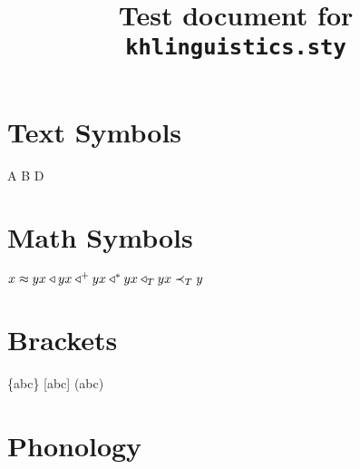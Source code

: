\documentclass{kharticle}
\title{Test document for \texttt{khlinguistics.sty}}
\begin{document}
\maketitle

\section{Text Symbols}

\begin{examplebox}
\larrow \rarrow \lrarrow \par
\emptystr \zero \par
\chkmark \xmark \par
A B \gap D \par
\end{examplebox}


\section{Math Symbols}

\begin{examplebox}
\begin{math}
x \approx y \\
x \triangleleft y \\
x \triangleleft^+ y \\
x \triangleleft^* y \\
x \triangleleft_T y \\
x \prec_T y
\end{math}
\end{examplebox}


\section{Brackets}

\begin{examplebox}
 \{abc\} [abc] (abc) \par
{} \par \par
{} \par
\end{examplebox}

\begin{examplebox}
\end{examplebox}


\section{Phonology}
\end{document}
